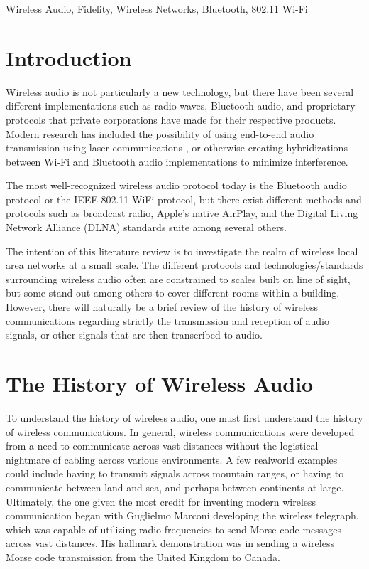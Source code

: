 \documentclass[conference]{IEEEtran}
\begin{document}
\begin{IEEEkeywords}
    Wireless Audio, Fidelity, Wireless Networks, Bluetooth, 802.11 Wi-Fi
\end{IEEEkeywords}

\section*{Introduction}
Wireless audio is not particularly a new technology, but there have been several different
implementations such as radio waves, Bluetooth audio, and proprietary protocols that
private corporations have made for their respective products.\cite{bhalla_unraveling_2021}
Modern research has included the possibility of using end-to-end audio transmission using
laser communications \cite{anthony_approach_2021}, or otherwise creating hybridizations
between Wi-Fi and Bluetooth audio implementations to minimize interference.
\cite{forenbacher_throughput_2021}

The most well-recognized wireless audio protocol today is the Bluetooth audio protocol
or the IEEE 802.11 WiFi protocol, but there exist different methods and protocols
such as broadcast radio, Apple's native AirPlay, and the Digital Living Network
Alliance (DLNA) standards suite among several others.\cite{parks_wireless_2013}

The intention of this literature review is to investigate the realm of wireless local area
networks at a small scale. The different protocols and technologies/standards
surrounding wireless audio often are constrained to scales built on line of sight,
but some stand out among others to cover different rooms within a building.
However, there will naturally be a brief review of the history of wireless
communications regarding strictly the transmission and reception of audio
signals, or other signals that are then transcribed to audio.

\section*{The History of Wireless Audio}
To understand the history of wireless audio, one must first understand the history of
wireless communications. In general, wireless communications were developed from a need to
communicate across vast distances without the logistical nightmare of cabling across various
environments. A few realworld examples could include having to transmit signals across
mountain ranges, or having to communicate between land and sea, and perhaps between
continents at large.\cite{noauthor_ericsson_2001} Ultimately, the one given the most credit
for inventing modern wireless communication began with Guglielmo Marconi developing the
wireless telegraph, which was capable of utilizing radio frequencies to send Morse code
messages across vast distances. His hallmark demonstration was in sending a wireless Morse
code transmission from the United Kingdom to Canada.\cite{noauthor_ericsson_2001}
\end{document}
